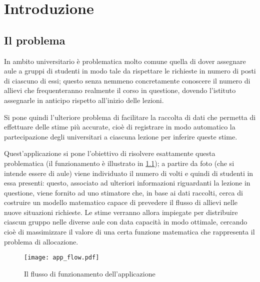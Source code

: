 \chapter{Introduzione}
\label{section:intro}

\section{Il problema}
\label{section:problem_section}

In ambito universitario è problematica molto comune quella di dover assegnare aule a 
gruppi di studenti in modo tale da rispettare le richieste in numero di posti
di ciascuno di essi; questo senza nemmeno concretamente conoscere il numero di allievi che frequenteranno 
realmente il corso in questione, dovendo l'istituto assegnarle in anticipo rispetto all'inizio
delle lezioni.

Si pone quindi l'ulteriore problema di facilitare la raccolta di dati che permetta di effettuare 
delle stime più accurate, cioè di registrare in modo automatico la partecipazione degli universitari
a ciascuna lezione per inferire queste stime.

\medskip

Quest'applicazione si pone l'obiettivo di risolvere esattamente questa problematica (il funzionamento è 
illustrato in \ref{fig:app_flow});
a partire da foto (che si intende essere di aule) viene individuato il numero di volti e quindi di studenti in essa 
presenti: questo, associato ad ulteriori informazioni riguardanti la lezione in questione, viene fornito 
ad uno stimatore che, in base ai dati raccolti, cerca di costruire un modello matematico 
capace di prevedere il flusso di allievi nelle nuove situazioni richieste. Le stime verranno allora impiegate 
per distribuire ciascun gruppo nelle diverse aule con data capacità in modo ottimale, cercando cioè di 
massimizzare il valore di una certa funzione matematica che rappresenta il problema di allocazione. 

\begin{figure}
    \begin{small}
        \begin{center}
            \texttt{[image: app\_flow.pdf]}
        \end{center}
        \caption{Il flusso di funzionamento dell'applicazione}
        \label{fig:app_flow}
    \end{small}
\end{figure}

